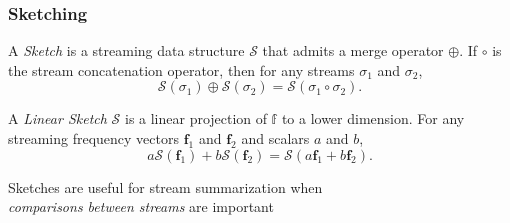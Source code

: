 \documentclass{beamer}
\begin{document}
\begin{frame}
\frametitle{Sketching}

\begin{definition}[Sketch]
A \emph{Sketch} is a streaming data structure $\mathcal{S}$ that admits a merge operator $\oplus$. 
If $\circ$ is the stream concatenation operator, then for any streams $\sigma_1$ and $\sigma_2$,
\begin{equation*}
	\mathcal{S}(\sigma_1) \oplus \mathcal{S}(\sigma_2) = \mathcal{S}(\sigma_1 \circ \sigma_2).
\end{equation*}
\end{definition}

\begin{definition}
A \emph{Linear Sketch} $\mathcal{S}$ is a linear projection of $\mathbb{f}$ to a lower dimension.
For any streaming frequency vectors $\mathbf{f}_1$ and $\mathbf{f}_2$ and scalars $a$ and $b$, 
\begin{equation*}
	a\mathcal{S}(\mathbf{f}_1) + b\mathcal{S}(\mathbf{f}_2) = \mathcal{S}(a\mathbf{f}_1 + b\mathbf{f}_2).
\end{equation*}
\end{definition}

\begin{block}{}
\begin{center}
	Sketches are useful for stream summarization when \\
	\emph{comparisons between streams} are important
\end{center}
\end{block}

\end{frame}

\end{document}
